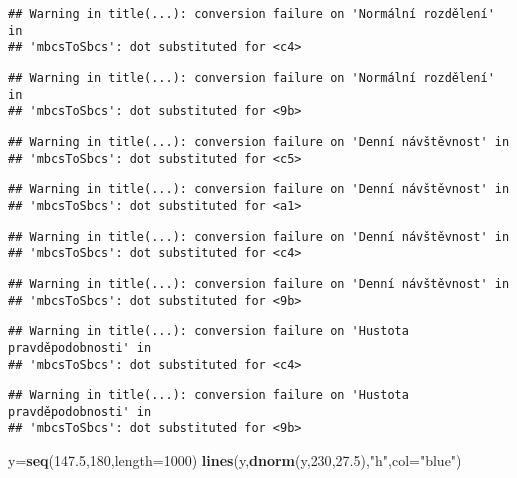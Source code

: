 \documentclass[
]{article}
\newenvironment{Shaded}{\begin{snugshade}}{\end{snugshade}}
\newcommand{\AttributeTok}[1]{\textcolor[rgb]{0.13,0.29,0.53}{#1}}
\newcommand{\DecValTok}[1]{\textcolor[rgb]{0.00,0.00,0.81}{#1}}
\newcommand{\FloatTok}[1]{\textcolor[rgb]{0.00,0.00,0.81}{#1}}
\newcommand{\FunctionTok}[1]{\textcolor[rgb]{0.13,0.29,0.53}{\textbf{#1}}}
\newcommand{\NormalTok}[1]{#1}
\newcommand{\OtherTok}[1]{\textcolor[rgb]{0.56,0.35,0.01}{#1}}
\newcommand{\StringTok}[1]{\textcolor[rgb]{0.31,0.60,0.02}{#1}}
\begin{document}
\begin{verbatim}
## Warning in title(...): conversion failure on 'Normální rozdělení' in
## 'mbcsToSbcs': dot substituted for <c4>
\end{verbatim}

\begin{verbatim}
## Warning in title(...): conversion failure on 'Normální rozdělení' in
## 'mbcsToSbcs': dot substituted for <9b>
\end{verbatim}

\begin{verbatim}
## Warning in title(...): conversion failure on 'Denní návštěvnost' in
## 'mbcsToSbcs': dot substituted for <c5>
\end{verbatim}

\begin{verbatim}
## Warning in title(...): conversion failure on 'Denní návštěvnost' in
## 'mbcsToSbcs': dot substituted for <a1>
\end{verbatim}

\begin{verbatim}
## Warning in title(...): conversion failure on 'Denní návštěvnost' in
## 'mbcsToSbcs': dot substituted for <c4>
\end{verbatim}

\begin{verbatim}
## Warning in title(...): conversion failure on 'Denní návštěvnost' in
## 'mbcsToSbcs': dot substituted for <9b>
\end{verbatim}

\begin{verbatim}
## Warning in title(...): conversion failure on 'Hustota pravděpodobnosti' in
## 'mbcsToSbcs': dot substituted for <c4>
\end{verbatim}

\begin{verbatim}
## Warning in title(...): conversion failure on 'Hustota pravděpodobnosti' in
## 'mbcsToSbcs': dot substituted for <9b>
\end{verbatim}

\begin{Shaded}
\begin{Highlighting}[]
\NormalTok{y}\OtherTok{=}\FunctionTok{seq}\NormalTok{(}\FloatTok{147.5}\NormalTok{,}\DecValTok{180}\NormalTok{,}\AttributeTok{length=}\DecValTok{1000}\NormalTok{)}
\FunctionTok{lines}\NormalTok{(y,}\FunctionTok{dnorm}\NormalTok{(y,}\DecValTok{230}\NormalTok{,}\FloatTok{27.5}\NormalTok{),}\StringTok{"h"}\NormalTok{,}\AttributeTok{col=}\StringTok{"blue"}\NormalTok{)}
\end{Highlighting}
\end{Shaded}
\end{document}

